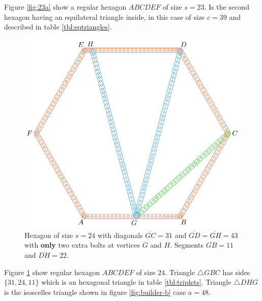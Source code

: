 \documentclass[11pt]{article}
\begin{document}
Figure \ref{fig:23a} show a regular hexagon $ABCDEF$ of size $s=23$. Is the second hexagon having an equilateral triangle inside, in this case of size $c=39$ and described in table \ref{tbl:eqtriangles}.

\begin{figure}[H]
\centering
\includegraphics[scale=0.9]{24/hexa-24a}
\caption{Hexagon of size $s = 24$ with diagonals $\overline{GC} = 31$ and $\overline{GD} = \overline{GH} = 43$ with \textbf{only} two extra bolts at vertices $G$ and $H$. Segments $\overline{GB} = 11$ and $\overline{DH} = 22$.}
\label{fig:24a}
\end{figure}

Figure \ref{fig:24a} show regular hexagon $ABCDEF$ of size $24$. Triangle $\triangle{GBC}$ has sides $\{31,24,11\}$ which is an hexagonal triangle in table \ref{tbl:triplets}. Triangle $\triangle{DHG}$ is the isoscelles triangle shown in figure \ref{fig:builder-b} case $a=48$.
\end{document}
